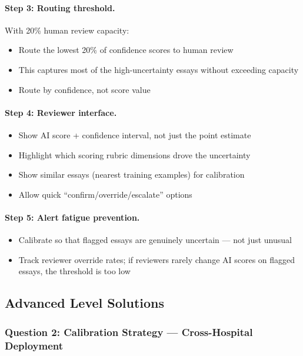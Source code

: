 \paragraph{Step 3: Routing threshold.}
With 20\% human review capacity:
\begin{itemize}
    \item Route the lowest 20\% of confidence scores to human review
    \item This captures most of the high-uncertainty essays without exceeding capacity
    \item Route by confidence, not score value
\end{itemize}

\paragraph{Step 4: Reviewer interface.}
\begin{itemize}
    \item Show AI score + confidence interval, not just the point estimate
    \item Highlight which scoring rubric dimensions drove the uncertainty
    \item Show similar essays (nearest training examples) for calibration
    \item Allow quick ``confirm/override/escalate'' options
\end{itemize}

\paragraph{Step 5: Alert fatigue prevention.}
\begin{itemize}
    \item Calibrate so that flagged essays are genuinely uncertain --- not just unusual
    \item Track reviewer override rates; if reviewers rarely change AI scores on flagged essays, the threshold is too low
\end{itemize}

\subsection{Advanced Level Solutions}

\subsubsection{Question 2: Calibration Strategy --- Cross-Hospital Deployment}

